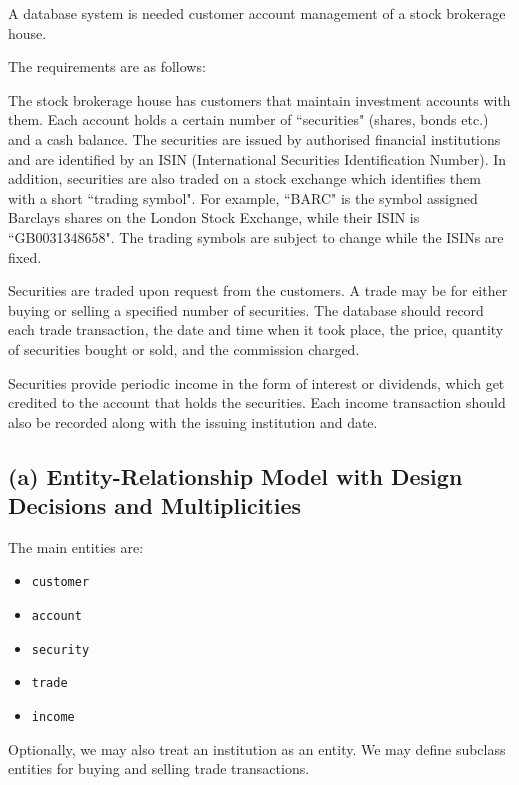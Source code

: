 A database system is needed customer account management of a stock brokerage house.

The requirements are as follows:

The stock brokerage house has customers that maintain investment accounts with them. Each account holds a certain number of ``securities" (shares, bonds etc.) and a cash balance. The securities are issued by authorised financial institutions and are identified by an ISIN (International Securities Identification Number). In addition, securities are also traded on a stock exchange which identifies them with a short ``trading symbol". For example, ``BARC" is the symbol assigned Barclays shares on the London Stock Exchange, while their ISIN is ``GB0031348658". The trading symbols are subject to change while the ISINs are fixed.

Securities are traded upon request from the customers. A trade may be for either buying or selling a specified number of securities. The database should record each trade transaction, the date and time when it took place, the price, quantity of securities bought or sold, and the commission charged.

Securities provide periodic income in the form of interest or dividends, which get credited to the account that holds the securities. Each income transaction should also be recorded along with the issuing institution and date.

\subsection*{(a) Entity-Relationship Model with Design Decisions and Multiplicities}

The main entities are:
\begin{itemize}
  \item \texttt{customer}
  \item \texttt{account}
  \item \texttt{security}
  \item \texttt{trade}
  \item \texttt{income}
\end{itemize}

Optionally, we may also treat an institution as an entity. We may define subclass entities for buying and selling trade transactions.

\bigskip

